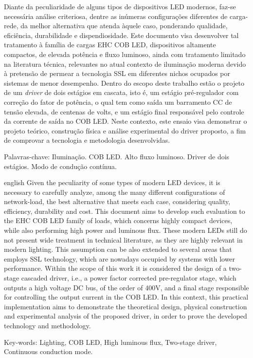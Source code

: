 \documentclass[
        12pt,
        openany, %
        oneside, %
        a4paper,			
        english,			
        brazil
        ]{abntbibufjf}
\begin{document}
\setlength{\absparsep}{18pt} 
\begin{resumo}
Diante da peculiaridade de alguns tipos de dispositivos LED modernos, faz-se necessária análise criteriosa, dentre as inúmeras configurações diferentes de carga-rede, da melhor alternativa que atenda àquele caso, ponderando qualidade, eficiência, durabilidade e dispendiosidade. Este documento visa desenvolver tal tratamento à família de cargas EHC COB LED, dispositivos altamente compactos, de elevada potência e fluxo luminoso, ainda com tratamento limitado na literatura técnica, relevantes no atual contexto de iluminação moderna devido à pretensão de permear a tecnologia SSL em diferentes nichos ocupados por sistemas de menor desempenho. Dentro do escopo deste trabalho estão o projeto de um \textit{driver} de dois estágios em cascata, isto é, um estágio pré-regulador com correção do fator de potência, o qual tem como saída um barramento CC de tensão elevada, de centenas de volts, e um estágio final responsável pelo controle da corrente de saída no COB LED. Neste contexto, este ensaio visa demonstrar o projeto teórico, construção física e análise experimental do driver proposto, a fim de comprovar a tecnologia e metodologia desenvolvidas.


Palavras-chave: Iluminação. COB LED. Alto fluxo luminoso. Driver de dois estágios. Modo de condução contínua.

\end{resumo}
 
 
\begin{resumo}[ABSTRACT]
 \begin{otherlanguage*}{english}
Given the peculiarity of some types of modern LED devices, it is necessary to carefully analyze, among the many different configurations of network-load, the best alternative that meets each case, considering quality, efficiency, durability and cost. This document aims to develop such evaluation to the EHC COB LED family of loads, which concerns highly compact devices, while also performing high power and luminous flux. These modern LEDs still do not present wide treatment in technical literature, as they are highly relevant in modern lighting. This assumption can be also extended to several areas that employs SSL technology, which are nowadays occupied by systems with lower performance. Within the scope of this work it is considered the design of a two-stage cascaded driver, i.e., a power factor corrected pre-regulator stage, which outputs a high voltage DC bus, of the order of 400V, and a final stage responsible for controlling the output current in the COB LED. In this context, this practical implementation aims to demonstrate the theoretical design, physical construction and experimental analysis of the proposed driver, in order to prove the developed technology and methodology.


Key-words: Lighting, COB LED, High luminous flux, Two-stage driver, Continuous conduction mode.
 \end{otherlanguage*}
\end{resumo}
\end{document}
